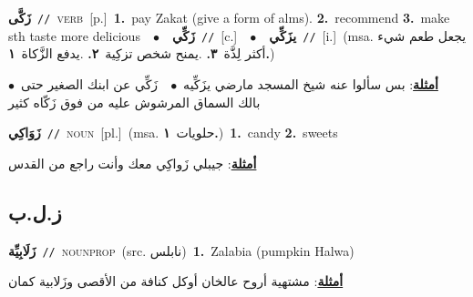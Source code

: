 \documentclass[10pt,a4paper,twoside]{article} %
\begin{document}
\begin{multicols}{2}
{\setlength\topsep{0pt}\textbf{\foreignlanguage{arabic}{زَكَّى}}\ {\color{gray}\texttt{//}\color{black}}\ \textsc{verb}\ [p.]\ \textbf{1.}~pay Zakat (give a form of alms).  \textbf{2.}~recommend  \textbf{3.}~make sth taste more delicious\ \ $\bullet$\ \ \setlength\topsep{0pt}\textbf{\foreignlanguage{arabic}{زَكِّي}}\ {\color{gray}\texttt{//}\color{black}}\ [c.]\ \ $\bullet$\ \ \setlength\topsep{0pt}\textbf{\foreignlanguage{arabic}{يزَكِّي}}\ {\color{gray}\texttt{//}\color{black}}\ [i.]\ \color{gray}(msa. \foreignlanguage{arabic}{يجعل طعم شيء أكثر لِذَّة}~\foreignlanguage{arabic}{\textbf{٣.}}  .\foreignlanguage{arabic}{يمنح شخص تزكِية}~\foreignlanguage{arabic}{\textbf{٢.}}  .\foreignlanguage{arabic}{يدفع الزَّكاة}~\foreignlanguage{arabic}{\textbf{١.}})\color{black}\  \begin{flushright}\color{gray}\foreignlanguage{arabic}{\textbf{\underline{\foreignlanguage{arabic}{أمثلة}}}: بس سألوا عنه شيخ المسجد مارضي يزَكِّيه\ $\bullet$\ \  زَكِّي عن ابنك الصغير حتى\ $\bullet$\ \  بالك السماق المرشوش عليه من فوق زَكّاه كثير}\end{flushright}\color{black}} \vspace{2mm}

{\setlength\topsep{0pt}\textbf{\foreignlanguage{arabic}{زَوَاكِي}}\ {\color{gray}\texttt{//}\color{black}}\ \textsc{noun}\ [pl.]\ \color{gray}(msa. \foreignlanguage{arabic}{حلويات}~\foreignlanguage{arabic}{\textbf{١.}})\color{black}\ \textbf{1.}~candy  \textbf{2.}~sweets\  \begin{flushright}\color{gray}\foreignlanguage{arabic}{\textbf{\underline{\foreignlanguage{arabic}{أمثلة}}}: جيبلي زَواكِي معك وأنت راجع من القدس}\end{flushright}\color{black}} \vspace{2mm}

\vspace{-3mm}
\subsection*{\color{blue}\foreignlanguage{arabic}{ز.ل.ب}\color{blue}{}} 

{\setlength\topsep{0pt}\textbf{\foreignlanguage{arabic}{زَلَابِيِّة}}\ {\color{gray}\texttt{//}\color{black}}\ \textsc{noun\textunderscore prop}\ (src. \color{gray}\foreignlanguage{arabic}{نابلس}\color{black})\ \textbf{1.}~Zalabia (pumpkin Halwa)\  \begin{flushright}\color{gray}\foreignlanguage{arabic}{\textbf{\underline{\foreignlanguage{arabic}{أمثلة}}}: مشتهية أروح عالخان أوكل كنافة من الأقصى وزَلابية كمان}\end{flushright}\color{black}} \vspace{2mm}


\end{multicols}
\end{document}
